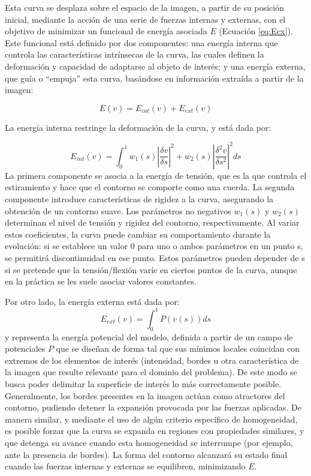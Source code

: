 Esta curva se desplaza sobre el espacio de la imagen, a partir de su posición inicial, mediante la acción de una serie de fuerzas internas y externas, con el objetivo de minimizar un funcional de energía asociada $E$ (Ecuación \ref{eq:Ecx}). Este funcional está definido por dos componentes: una energía interna que controla las características intrínsecas de la curva, las cuales definen la deformación y capacidad de adaptarse al objeto de interés; y una energía externa, que guía o “empuja” esta curva, basándose en información extraída a partir de la imagen:


%
\begin{equation}
	E(v) = E_{int}(v) + E_{ext}(v)
\label{eq:Ecx}
\end{equation}
%


La energía interna restringe la deformación de la curva, y está dada por:

%
\begin{equation}
E_{int}(v) = \int_{0}^{1} w_{1}(s) \left| \dfrac{\delta v}{\delta s} \right|^{2} + w_{2}(s) \left|\dfrac{\delta^{2}v}{\delta s^2} \right|^{2} ds
\end{equation}
%
La primera componente se asocia a la energía de tensión, que es la que controla el estiramiento y hace que el contorno se comporte como una cuerda. La segunda componente introduce características de rigidez a la curva, asegurando la obtención de un contorno suave. Los parámetros no negativos $w_{1}(s)$ y $w_{2}(s)$ determinan el nivel de tensión y rigidez del contorno, respectivamente. Al variar estos coeficientes, la curva puede cambiar su comportamiento durante la evolución: si se establece un valor 0 para uno o ambos parámetros en un punto s, se permitirá discontinuidad en ese punto. Estos parámetros pueden depender de s si se pretende que la tensión/flexión varíe en ciertos puntos de la curva, aunque en la práctica se les suele asociar valores constantes.

Por otro lado, la energía externa está dada por:
%
\begin{equation}
	E_{ext}(v) = \int_{0}^{1} P(v(s))ds
\end{equation}
%
y representa la energía potencial del modelo, definida a partir de un campo de potenciales $P$ que se diseñan de forma tal que sus mínimos locales coincidan con extremos de los elementos de interés (intensidad, bordes u otra característica de la imagen que resulte relevante para el dominio del problema). De este modo se busca poder delimitar la superficie de interés lo más correctamente posible. Generalmente, los bordes presentes en la imagen actúan como atractores del contorno, pudiendo detener la expansión provocada por las fuerzas aplicadas. De manera similar, y mediante el uso de algún criterio específico de homogeneidad, es posible forzar que la curva se expanda en regiones con propiedades similares, y que detenga su avance cuando esta homogeneidad se interrumpe (por ejemplo, ante la presencia de bordes).
La forma del contorno alcanzará su estado final cuando las fuerzas internas y externas se equilibren, minimizando $E$.

